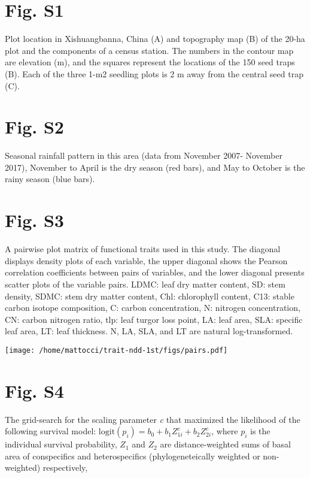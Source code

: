 \documentclass[
  12pt,
  letterpaper,
  DIV=11,
  numbers=noendperiod]{scrartcl}
\author{}
\date{}
\begin{document}
\hypertarget{fig.-s1}{%
\section{Fig. S1}\label{fig.-s1}}

Plot location in Xishuangbanna, China (A) and topography map (B) of the
20-ha plot and the components of a census station. The numbers in the
contour map are elevation (m), and the squares represent the locations
of the 150 seed traps (B). Each of the three 1-m2 seedling plots is 2 m
away from the central seed trap (C).

\newpage

\hypertarget{fig.-s2}{%
\section{Fig. S2}\label{fig.-s2}}

Seasonal rainfall pattern in this area (data from November 2007-
November 2017), November to April is the dry season (red bars), and May
to October is the rainy season (blue bars).

\newpage

\hypertarget{fig.-s3}{%
\section{Fig. S3}\label{fig.-s3}}

A pairwise plot matrix of functional traits used in this study. The
diagonal displays density plots of each variable, the upper diagonal
shows the Pearson correlation coefficients between pairs of variables,
and the lower diagonal presents scatter plots of the variable pairs.
LDMC: leaf dry matter content, SD: stem density, SDMC: stem dry matter
content, Chl: chlorophyll content, C13: stable carbon isotope
composition, C: carbon concentration, N: nitrogen concentration, CN:
carbon nitrogen ratio, tlp: leaf turgor loss point, LA: leaf area, SLA:
specific leaf area, LT: leaf thickness. N, LA, SLA, and LT are natural
log-transformed.

\texttt{[image: /home/mattocci/trait-ndd-1st/figs/pairs.pdf]}

\newpage

\hypertarget{fig.-s4}{%
\section{Fig. S4}\label{fig.-s4}}

The grid-search for the scaling parameter \emph{c} that maximized the
likelihood of the following survival model:
\(\mathrm{logit}(p_i) = b_0 + b_1 Z_{1i}^c + b_2 Z_{2i}^c\), where
\(p_i\) is the individual survival probability, \(Z_1\) and \(Z_2\) are
distance-weighted sums of basal area of conspecifics and heterospecifics
(phylogeneteically weighted or non-weighted) respectively,
\end{document}
